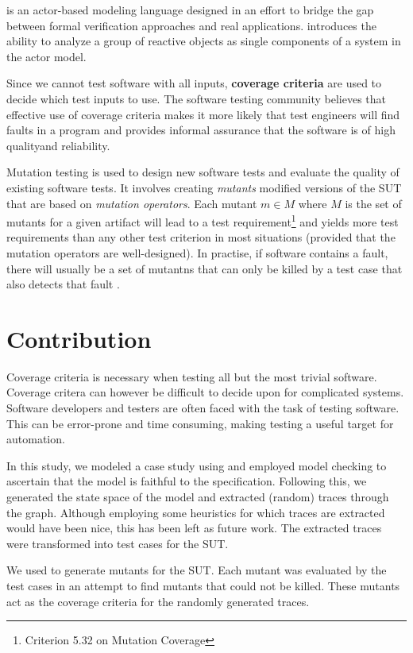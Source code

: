 \documentclass{article}
\begin{document}
		\Rebeca is an actor-based modeling language designed in an effort to bridge the gap between formal verification approaches and real applications. \Rebeca introduces the ability to analyze a group of reactive objects as single components of a system in the actor model.

		Since we cannot test software with all inputs, \textbf{coverage criteria} are used to decide which test inputs to use. The software testing community believes that effective use of coverage criteria makes it more likely that test engineers will find faults in a program and provides informal assurance that the software is of high qualityand reliability. 

		Mutation testing is used to design new software tests and evaluate the quality of existing software tests. It involves creating \textit{mutants} modified versions of the SUT that are based on \textit{mutation operators}. Each mutant $m \in M$ where $M$ is the set of mutants for a given artifact will lead to a test requirement\footnote{Criterion 5.32 on Mutation Coverage} and yields more test requirements than any other test criterion in most situations (provided that the mutation operators are well-designed). In practise, if software contains a fault, there will usually be a set of mutantns that can only be killed by a test case that also detects that fault \citep{ammann2008introduction}.



	\section{Contribution}
		Coverage criteria is necessary when testing all but the most trivial software. Coverage critera can however be difficult to decide upon for complicated systems. Software developers and testers are often faced with the task of testing software. This can be error-prone and time consuming, making testing a useful target for automation.

		In this study, we modeled a case study using \Rebeca and employed model checking to ascertain that the model is faithful to the specification. Following this, we generated the state space of the model and extracted (random) traces through the graph. Although employing some heuristics for which traces are extracted would have been nice, this has been left as future work. The extracted traces were transformed into test cases for the SUT.

		We used \citeauthor{mujava} to generate mutants for the SUT. Each mutant was evaluated by the test cases in an attempt to find mutants that could not be killed. These mutants act as the coverage criteria for the randomly generated traces.
\end{document}
